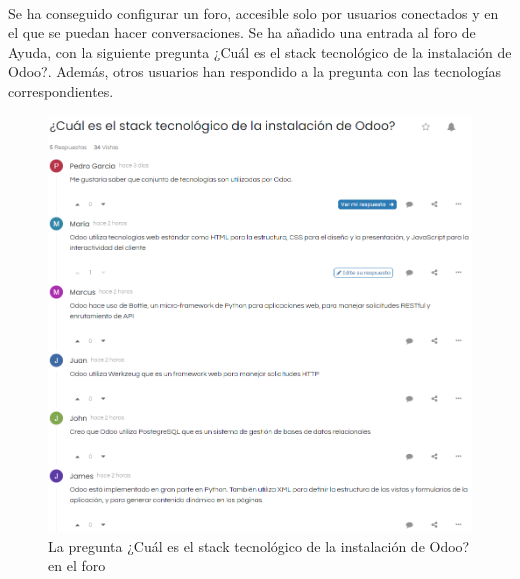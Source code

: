 \paragraph{}
Se ha conseguido configurar un foro, accesible solo por usuarios conectados y en el que se puedan hacer conversaciones.
Se ha añadido una entrada al foro de Ayuda, con la siguiente pregunta ¿Cuál es el stack tecnológico de la instalación de Odoo?. Además, otros usuarios han respondido a la pregunta con las tecnologías correspondientes. 
\newpage
\begin{figure}[h]
    \centering
    \includegraphics[width=1\linewidth]{fotosGestCon/pregunta1.png}
    \caption{La pregunta ¿Cuál es el stack tecnológico de la instalación de Odoo? en el foro}
    \label{fig:enter-label}
\end{figure}
